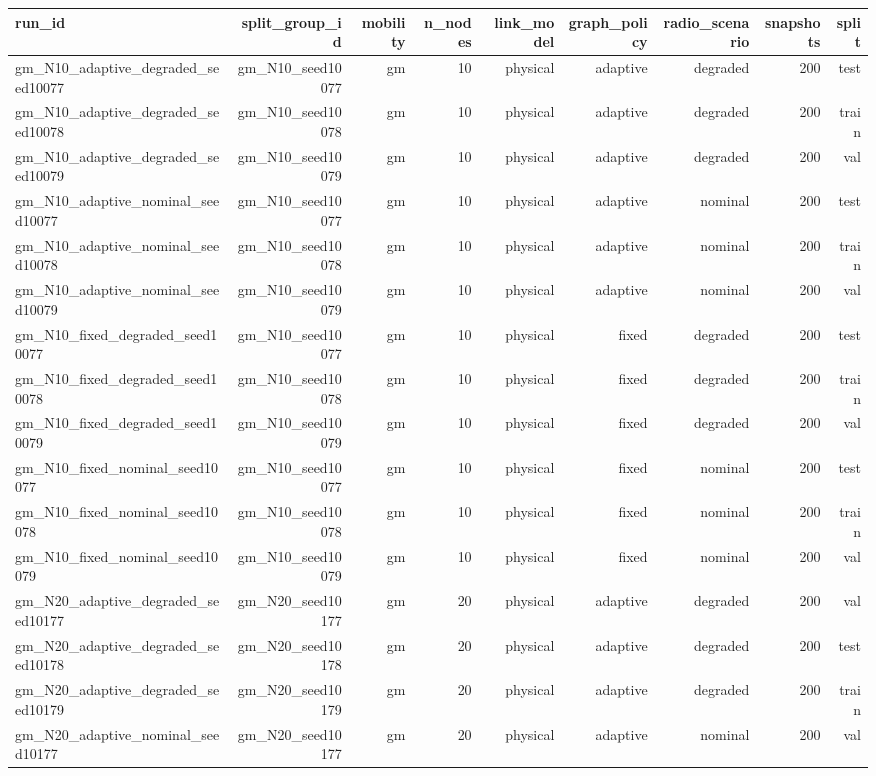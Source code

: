 \begin{tabular}{lrrrrrrrr}
\toprule
run\_id & split\_group\_id & mobility & n\_nodes & link\_model & graph\_policy & radio\_scenario & snapshots & split \\
\midrule
gm\_N10\_adaptive\_degraded\_seed10077 & gm\_N10\_seed10077 & gm & 10 & physical & adaptive & degraded & 200 & test \\
gm\_N10\_adaptive\_degraded\_seed10078 & gm\_N10\_seed10078 & gm & 10 & physical & adaptive & degraded & 200 & train \\
gm\_N10\_adaptive\_degraded\_seed10079 & gm\_N10\_seed10079 & gm & 10 & physical & adaptive & degraded & 200 & val \\
gm\_N10\_adaptive\_nominal\_seed10077 & gm\_N10\_seed10077 & gm & 10 & physical & adaptive & nominal & 200 & test \\
gm\_N10\_adaptive\_nominal\_seed10078 & gm\_N10\_seed10078 & gm & 10 & physical & adaptive & nominal & 200 & train \\
gm\_N10\_adaptive\_nominal\_seed10079 & gm\_N10\_seed10079 & gm & 10 & physical & adaptive & nominal & 200 & val \\
gm\_N10\_fixed\_degraded\_seed10077 & gm\_N10\_seed10077 & gm & 10 & physical & fixed & degraded & 200 & test \\
gm\_N10\_fixed\_degraded\_seed10078 & gm\_N10\_seed10078 & gm & 10 & physical & fixed & degraded & 200 & train \\
gm\_N10\_fixed\_degraded\_seed10079 & gm\_N10\_seed10079 & gm & 10 & physical & fixed & degraded & 200 & val \\
gm\_N10\_fixed\_nominal\_seed10077 & gm\_N10\_seed10077 & gm & 10 & physical & fixed & nominal & 200 & test \\
gm\_N10\_fixed\_nominal\_seed10078 & gm\_N10\_seed10078 & gm & 10 & physical & fixed & nominal & 200 & train \\
gm\_N10\_fixed\_nominal\_seed10079 & gm\_N10\_seed10079 & gm & 10 & physical & fixed & nominal & 200 & val \\
gm\_N20\_adaptive\_degraded\_seed10177 & gm\_N20\_seed10177 & gm & 20 & physical & adaptive & degraded & 200 & val \\
gm\_N20\_adaptive\_degraded\_seed10178 & gm\_N20\_seed10178 & gm & 20 & physical & adaptive & degraded & 200 & test \\
gm\_N20\_adaptive\_degraded\_seed10179 & gm\_N20\_seed10179 & gm & 20 & physical & adaptive & degraded & 200 & train \\
gm\_N20\_adaptive\_nominal\_seed10177 & gm\_N20\_seed10177 & gm & 20 & physical & adaptive & nominal & 200 & val \\

\end{tabular}
